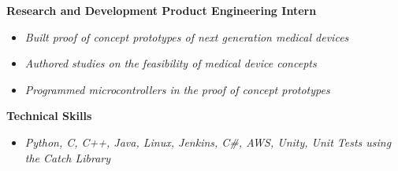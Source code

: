 \documentclass[8pt]{extarticle}
\begin{document}
\textbf{Research and Development Product Engineering Intern} 
\begin{itemize}
\item \textit{Built proof of concept prototypes of next generation medical devices}
\item \textit{Authored studies on the feasibility of medical device concepts}
\item \textit{Programmed microcontrollers in the proof of concept prototypes}

\end{itemize}
\begin{changemargin}{-0.8cm}{0.0cm}
	\textbf{Technical Skills}
\end{changemargin}
\vspace*{-0.4cm}
\makebox[\linewidth]{\rule{17cm}{0.4pt}}
\begin{itemize}
\item \textit{Python, C, C++, Java, Linux, Jenkins, C\#, AWS, Unity, Unit Tests using the Catch Library}
\end{itemize}
\end{document}
